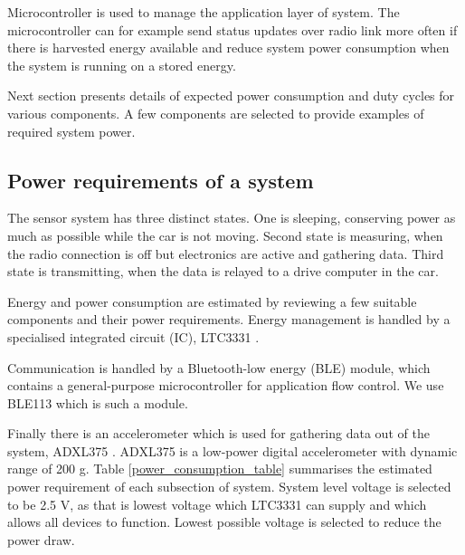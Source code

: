 Microcontroller is used to manage the application layer of system. The microcontroller can for example  send status updates over radio link more often if there is harvested energy available and reduce system power consumption when the system is running on a stored energy.

Next section presents details of expected power consumption and duty cycles for various components. A few components are selected to provide examples of required system power.

\subsection{Power requirements of a system} \label{sect:power_requirement}
The sensor system has three distinct states. One is sleeping, conserving power as much as possible while the car is not moving.
Second state is measuring, when the radio connection is off but electronics are active and gathering data.
Third state is transmitting, when the data is relayed to a drive computer in the car.

Energy and power consumption are estimated by reviewing a few suitable components and their power requirements. 
Energy management is handled by a specialised integrated circuit (IC), LTC3331 \cite{Technology}.

Communication is handled by a Bluetooth-low energy (BLE) module, which contains a general-purpose microcontroller for application flow control.
We use BLE113 \cite{Bluegiga2013} which is such a module.

Finally there is an accelerometer which is used for gathering data out of the system, ADXL375 \cite{ADXLDatasheet}. ADXL375 is a low-power digital accelerometer with dynamic range of 200 g. Table \ref{power_consumption_table}  summarises the estimated power requirement of each subsection of system. System level voltage is selected to be 2.5 V, as that is lowest voltage which LTC3331 can supply and which allows all devices to function. Lowest possible voltage is selected to reduce the power draw.

\begin{table}[htb]
\caption{\label{power_consumption_table} Current and power consumption of system at different activity levels. Power is calculated from current by multiplying current with 2.5 V.}
\begin{center}
\end{center}
\end{table}

